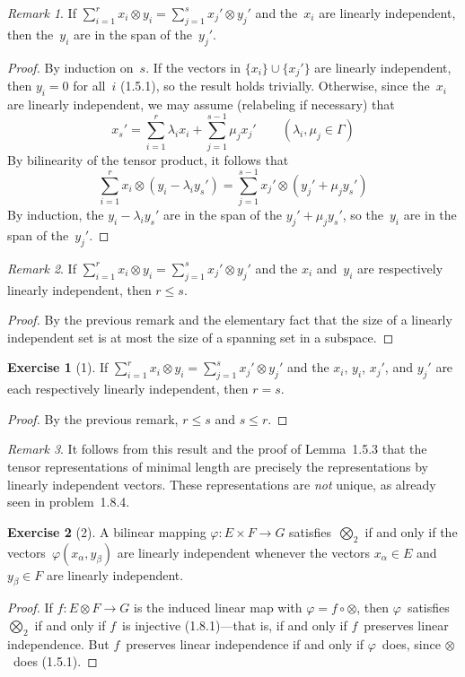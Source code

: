 \documentclass[letterpaper,12pt]{article}
\newcommand{\union}{\cup}
\newcommand{\after}{\circ}
\newcommand{\tprod}{\otimes}
\newcommand{\bigtprod}{\bigotimes}
\newcommand{\medtprod}{{\textstyle\bigtprod}}
\theoremstyle{definition}
\newtheorem*{exer}{Exercise}
\theoremstyle{remark}
\newtheorem*{rmk}{Remark}
\begin{document}
\begin{rmk}
If \(\sum_{i=1}^r x_i\tprod y_i=\sum_{j=1}^s x_j'\tprod y_j'\) and the~\(x_i\) are linearly independent, then the~\(y_i\) are in the span of the~\(y_j'\).
\end{rmk}
\begin{proof}
By induction on~\(s\). If the vectors in \(\{x_i\}\union\{x_j'\}\) are linearly independent, then \(y_i=0\) for all~\(i\) (1.5.1), so the result holds trivially. Otherwise, since the~\(x_i\) are linearly independent, we may assume (relabeling if necessary) that
\[x_s'=\sum_{i=1}^r\lambda_i x_i+\sum_{j=1}^{s-1}\mu_j x_j'\qquad(\lambda_i,\mu_j\in\Gamma)\]
By bilinearity of the tensor product, it follows that
\[\sum_{i=1}^r x_i\tprod(y_i-\lambda_i y_s')=\sum_{j=1}^{s-1}x_j'\tprod(y_j'+\mu_j y_s')\]
By induction, the \(y_i-\lambda_iy_s'\) are in the span of the \(y_j'+\mu_jy_s'\), so the~\(y_i\) are in the span of the~\(y_j'\).
\end{proof}

\begin{rmk}
If \(\sum_{i=1}^r x_i\tprod y_i=\sum_{j=1}^s x_j'\tprod y_j'\) and the \(x_i\) and~\(y_i\) are respectively linearly independent, then \(r\le s\).
\end{rmk}
\begin{proof}
By the previous remark and the elementary fact that the size of a linearly independent set is at most the size of a spanning set in a subspace.
\end{proof}

\begin{exer}[1]
If \(\sum_{i=1}^r x_i\tprod y_i=\sum_{j=1}^s x_j'\tprod y_j'\) and the \(x_i\), \(y_i\), \(x_j'\), and \(y_j'\) are each respectively linearly independent, then \(r=s\).
\end{exer}
\begin{proof}
By the previous remark, \(r\le s\) and \(s\le r\).
\end{proof}
\begin{rmk}
It follows from this result and the proof of Lemma~1.5.3 that the tensor representations of minimal length are precisely the representations by linearly independent vectors. These representations are \emph{not} unique, as already seen in problem~1.8.4.
\end{rmk}

\begin{exer}[2]
A bilinear mapping \(\varphi:E\times F\to G\) satisfies~\(\medtprod_2\) if and only if the vectors~\(\varphi(x_{\alpha},y_{\beta})\) are linearly independent whenever the vectors \(x_{\alpha}\in E\) and \(y_{\beta}\in F\) are linearly independent.
\end{exer}
\begin{proof}
If \(f:E\tprod F\to G\) is the induced linear map with \(\varphi=f\after\tprod\), then \(\varphi\)~satisfies \(\medtprod_2\) if and only if \(f\)~is injective (1.8.1)---that is, if and only if \(f\)~preserves linear independence. But \(f\)~preserves linear independence if and only if \(\varphi\)~does, since \(\tprod\)~does (1.5.1).
\end{proof}
\end{document}
